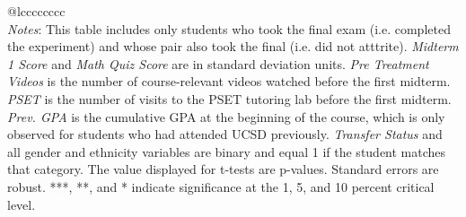 \begin{tabular}{@{\extracolsep{5pt}}lcccccccc}
\hline \hline \\[-1.8ex]
{\textit{Notes}: This table includes only students who took the final exam (i.e. completed the  experiment) and whose pair also took the final (i.e. did not atttrite).  \textit{Midterm 1 Score} and \textit{Math Quiz Score} are in standard  deviation units. \textit{Pre Treatment Videos} is the number of course-relevant  videos watched before the first midterm. \textit{PSET} is the number of visits  to the PSET tutoring lab before the first midterm. \textit{Prev. GPA} is the cumulative  GPA at the beginning of the course, which is only observed for students who had attended  UCSD previously. \textit{Transfer Status} and all gender and ethnicity variables  are binary and equal 1 if the student matches that category.  The value displayed for t-tests are p-values. Standard errors are robust. ***, **, and * indicate significance at the 1, 5, and 10 percent critical level. }
\end{tabular}
